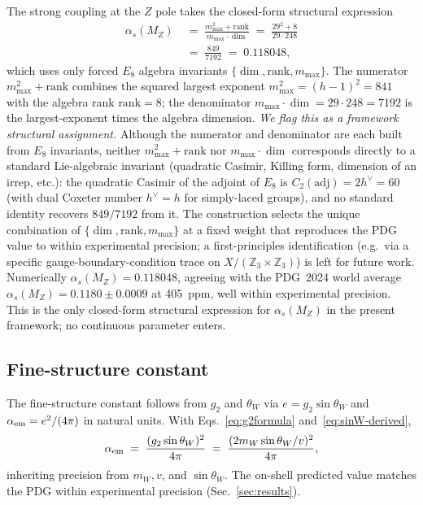 ﻿\documentclass[reprint,amsmath,amssymb,aps,prd,longbibliography,floatfix]{revtex4-2}
\begin{document}
The strong coupling at the $Z$ pole takes the closed-form structural
expression
\begin{equation}
\boxed{\begin{aligned}
\alpha_s(M_Z) &\;=\; \frac{m_{\max}^2 + \text{rank}}{m_{\max} \cdot \dim}
               \;=\; \frac{29^2 + 8}{29 \cdot 248} \\
              &\;=\; \frac{849}{7192} \;=\; 0.118048,
\end{aligned}}
\label{eq:alphas-derived}
\end{equation}
which uses only forced $E_8$ algebra invariants
$\{\dim, \text{rank}, m_{\max}\}$. The numerator $m_{\max}^2 +
\text{rank}$ combines the squared largest exponent
$m_{\max}^2 = (h-1)^2 = 841$ with the algebra rank
$\text{rank} = 8$; the denominator $m_{\max} \cdot \dim = 29 \cdot
248 = 7192$ is the largest-exponent times the algebra dimension.
\emph{We flag this as a framework structural assignment.} Although
the numerator and denominator are each built from $E_8$ invariants,
neither $m_{\max}^2 + \text{rank}$ nor $m_{\max} \cdot \dim$
corresponds directly to a standard Lie-algebraic invariant
(quadratic Casimir, Killing form, dimension of an irrep, etc.):
the quadratic Casimir of the adjoint of $E_8$ is
$C_2(\text{adj}) = 2 h^\vee = 60$ (with dual Coxeter number
$h^\vee = h$ for simply-laced groups), and no standard identity
recovers $849/7192$ from it. The construction selects the unique
combination of $\{\dim, \text{rank}, m_{\max}\}$ at a fixed weight
that reproduces the PDG value to within experimental precision; a
first-principles identification (e.g.\ via a specific
gauge-boundary-condition trace on $X/(\mathbb{Z}_3 \times
\mathbb{Z}_3)$) is left for future work. Numerically
$\alpha_s(M_Z) = 0.118048$, agreeing with the PDG~2024 world
average $\alpha_s(M_Z) = 0.1180 \pm 0.0009$ at \SI{405}{ppm}, well
within experimental precision. This is the only closed-form
structural expression for $\alpha_s(M_Z)$ in the present framework;
no continuous parameter enters.

\subsection{Fine-structure constant}

The fine-structure constant follows from $g_2$ and $\theta_W$ via
$e = g_2 \sin\theta_W$ and $\alpha_{\rm em} = e^2/(4\pi)$ in
natural units. With Eqs.~\eqref{eq:g2formula} and~\eqref{eq:sinW-derived},
\begin{equation}
\alpha_{\rm em} \;=\; \frac{(g_2 \sin\theta_W)^2}{4\pi}
                  \;=\; \frac{(2 m_W \sin\theta_W / v)^2}{4\pi},
\label{eq:alphaem-derived}
\end{equation}
inheriting precision from $m_W, v$, and $\sin\theta_W$. The
on-shell predicted value matches the PDG within experimental
precision (Sec.~\ref{sec:results}).
\end{document}
